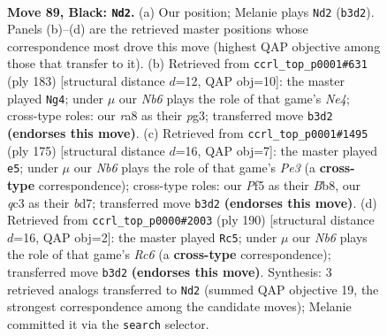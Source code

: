 \documentclass[11pt]{article}
\begin{document}
\clearpage

\begin{figure}[p]\centering
\begin{subfigure}{0.46\textwidth}\centering
\resizebox{\linewidth}{!}{%
\newchessgame
\chessboard[
  setfen={R7/8/6p1/3k1p2/5P2/1nQ5/6K1/8 b - - 2 89},
  showmover=false,
  pgfstyle=straightmove, color=movearrow, markmove={b3-d2}
]}
\caption{}
\end{subfigure}\hfill
\begin{subfigure}{0.46\textwidth}\centering
\resizebox{\linewidth}{!}{%
\newchessgame
\chessboard[
  setfen={6k1/2Q5/5p2/4nPp1/3K4/6P1/8/8 b - - 3 92},
  showmover=false,
  pgfstyle=straightmove, color=movearrow, markmove={e5-g4}
]}
\caption{}
\end{subfigure}
\\[4pt]
\begin{subfigure}{0.46\textwidth}\centering
\resizebox{\linewidth}{!}{%
\newchessgame
\chessboard[
  setfen={1b6/3B4/4p3/2k2p2/8/5P2/8/5K2 b - - 3 88},
  showmover=false,
  pgfstyle=straightmove, color=movearrow, markmove={e6-e5}
]}
\caption{}
\end{subfigure}\hfill
\begin{subfigure}{0.46\textwidth}\centering
\resizebox{\linewidth}{!}{%
\newchessgame
\chessboard[
  setfen={8/5k2/2R5/5p2/r4P2/4P3/8/4K3 w - - 69 96},
  showmover=false,
  pgfstyle=straightmove, color=movearrow, markmove={c6-c5}
]}
\caption{}
\end{subfigure}
\caption{\textbf{Move 89, Black: \texttt{Nd2}.} (a) Our position; Melanie plays \texttt{Nd2} (\texttt{b3d2}). Panels (b)--(d) are the retrieved master positions whose correspondence most drove this move (highest QAP objective among those that transfer to it). (b) Retrieved from \texttt{ccrl\_top\_p0001\#631} (ply 183) [structural distance $d$=12, QAP obj=10]: the master played \texttt{Ng4}; under $\mu$ our \emph{Nb6} plays the role of that game's \emph{Ne4}; cross-type roles: our \emph{r}a8 as their \emph{p}g3; transferred move \texttt{b3d2} \textbf{(endorses this move)}. (c) Retrieved from \texttt{ccrl\_top\_p0001\#1495} (ply 175) [structural distance $d$=16, QAP obj=7]: the master played \texttt{e5}; under $\mu$ our \emph{Nb6} plays the role of that game's \emph{Pe3} (a \textbf{cross-type} correspondence); cross-type roles: our \emph{P}f5 as their \emph{B}b8, our \emph{q}c3 as their \emph{b}d7; transferred move \texttt{b3d2} \textbf{(endorses this move)}. (d) Retrieved from \texttt{ccrl\_top\_p0000\#2003} (ply 190) [structural distance $d$=16, QAP obj=2]: the master played \texttt{Rc5}; under $\mu$ our \emph{Nb6} plays the role of that game's \emph{Rc6} (a \textbf{cross-type} correspondence); transferred move \texttt{b3d2} \textbf{(endorses this move)}. Synthesis: 3 retrieved analogs transferred to \texttt{Nd2} (summed QAP objective 19, the strongest correspondence among the candidate moves); Melanie committed it via the \texttt{search} selector.}
\label{fig:thought-m177}
\end{figure}
\end{document}

